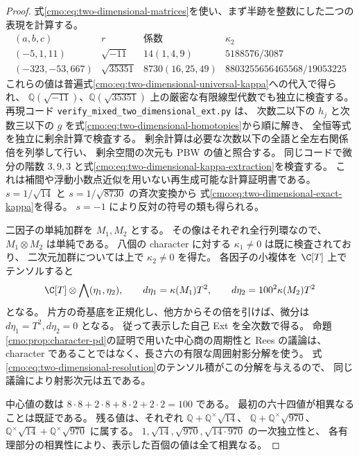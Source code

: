 \begin{proof}
式\eqref{cmo:eq:two-dimensional-matrices}を使い、まず半跡を整数にした二つの表現を計算する。
\[
 \begin{array}{c|c|c|c}
 (a,b,c)&r&\text{係数}&\kappa_2\\\hline
 (-5,1,11)&\sqrt{-11}&14(1,4,9)&5188576/3087\\
 (-323,-53,667)&\sqrt{35351}&8730(16,25,49)&
 8803255656465568/19053225
 \end{array}
\]
これらの値は普遍式\eqref{cmo:eq:two-dimensional-universal-kappa}への代入で得られ、
$\mathbb Q(\sqrt{-11})$、$\mathbb Q(\sqrt{35351})$ 上の厳密な有限線型代数でも独立に検査する。
再現コード \texttt{verify\_mixed\_two\_dimensional\_ext.py} は、
次数二以下の $h_j$ と次数三以下の $g$ を式\eqref{cmo:eq:two-dimensional-homotopies}から順に解き、
全恒等式を独立に剰余計算で検査する。
剰余計算は必要な次数以下の全語と全左右関係倍を列挙して行い、
剰余空間の次元も PBW の値と照合する。
同じコードで微分の階数 $3,9,3$ と式\eqref{cmo:eq:two-dimensional-kappa-extraction}を検査する。
これは補間や浮動小数点近似を用いない再生成可能な計算証明書である。
$s=1/\sqrt{14}$ と $s=1/\sqrt{8730}$ の斉次変換から
式\eqref{cmo:eq:two-dimensional-exact-kappa}を得る。
$s=-1$ により反対の符号の類も得られる。

二因子の単純加群を $M_1,M_2$ とする。
その像はそれぞれ全行列環なので、$M_1\otimes M_2$ は単純である。
八個の character に対する $\kappa_1\ne0$ は既に検査されており、
二次元加群については上で $\kappa_2\ne0$ を得た。
各因子の小複体を $\C[T]$ 上でテンソルすると
\[
 \C[T]\otimes\bigwedge(\eta_1,\eta_2),\qquad
 d\eta_1=\kappa(M_1)T^2,\qquad
 d\eta_2=100^2\kappa(M_2)T^2
\]
となる。
片方の奇基底を正規化し、他方からその倍を引けば、微分は
$d\eta_1=T^2,d\eta_2=0$ となる。
従って表示した自己 Ext を全次数で得る。
命題\ref{cmo:prop:character-pd}の証明で用いた中心商の周期性と Rees の議論は、
character であることではなく、長さ六の有限な周囲射影分解を使う。
式\eqref{cmo:eq:two-dimensional-resolution}のテンソル積がこの分解を与えるので、
同じ議論により射影次元は五である。

中心値の数は $8\cdot8+2\cdot8+8\cdot2+2\cdot2=100$ である。
最初の六十四値が相異なることは既証である。
残る値は、それぞれ $\mathbb Q+\mathbb Q^\times\sqrt{14}$、
$\mathbb Q+\mathbb Q^\times\sqrt{970}$、
$\mathbb Q^\times\sqrt{14}+\mathbb Q^\times\sqrt{970}$ に属する。
$1,\sqrt{14},\sqrt{970},\sqrt{14\cdot970}$ の一次独立性と、
各有理部分の相異性により、表示した百個の値は全て相異なる。
\end{proof}

